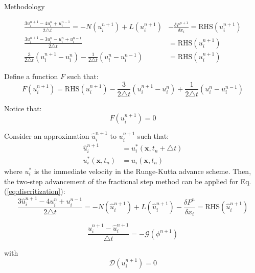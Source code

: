 \documentclass{beamer}
\newcommand{\timestep}{ \triangle t }
\begin{document}
\begin{frame}{Methodology}
	\framebreak
	
	\begin{align}
		\frac{ 3 u_i^{n+1} - 4 u_i^{n} + u_i^{n-1} }{ 2 \timestep } = - N (u_i^{n+1}) + L(u_i^{n+1}) &- \frac{\delta P^{n+1}}{\delta x_i} = \text{RHS}(u_i^{n+1}) \\
		\frac{ 3 u_i^{n+1} - 3 u_i^{n} - u_i^{n} + u_i^{n-1} }{ 2 \timestep } &= \text{RHS}(u_i^{n+1}) \\
		\frac{3}{2 \timestep} \left( u_i^{n+1} - u_i^{n} \right) - \frac{1}{2 \timestep} \left( u_i^{n} - u_i^{n-1} \right) &= \text{RHS}(u_i^{n+1})
	\end{align}
	
	Define a function $F$ such that:
	\begin{equation}
		F(u_i^{n+1}) = \text{RHS}(u_i^{n+1}) - \frac{3}{2 \timestep} \left( u_i^{n+1} - u_i^{n} \right) + \frac{1}{2 \timestep} \left( u_i^{n} - u_i^{n-1} \right)
	\end{equation}
	
	Notice that:
	\begin{equation}
		F(u_i^{n+1}) = 0
	\end{equation}

	\framebreak
	
	Consider an approximation $\hat{u}_i^{n+1}$ to $u_i^{n+1}$ such that:
	\begin{align}
		\hat{u}_i^{n+1} &= u_i^*(\mathbf{x}, t_n + \timestep) \\
		u_i^*(\mathbf{x}, t_n) &= u_i(\mathbf{x}, t_n)
	\end{align}
	where $u_i^*$ is the immediate velocity in the Runge-Kutta advance scheme. Then, the two-step advancement of the fractional step method can be applied for Eq. (\ref{eq:discritization}):
	\begin{equation}
		\frac{ 3 \hat{u}_i^{n+1} - 4 u_i^{n} + u_i^{n-1} }{ 2 \timestep } = - N(\hat{u}_i^{n+1}) + L(\hat{u}_i^{n+1}) - \frac{\delta P^{n}}{\delta x_i} = \text{RHS}(\hat{u}_i^{n+1}) \label{eq:my_scheme_1st_advance_step}
	\end{equation}
	
	\begin{equation}
		\frac{u_i^{n+1} -\hat{u}_i^{n+1}}{\timestep} = -\mathcal{G}(\phi^{n+1}) \label{eq:my_scheme_2st_advance_step}
	\end{equation}

	with
	\begin{equation}
		\mathcal{D}(u_i^{n+1}) = 0
	\end{equation}
	

\end{frame}
\end{document}
